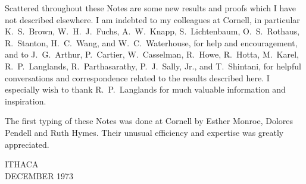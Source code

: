 Scattered throughout these Notes are some new results and proofs which I have not described elsewhere. I am indebted to my colleagues at Cornell, in particular K.~S.~Brown, W.~H.~J.~Fuchs, A.~W.~Knapp, S.~Lichtenbaum, O.~S.~Rothaus, R.~Stanton, H.~C.~Wang, and W.~C.~Waterhouse, for help and encouragement, and to J.~G.~Arthur, P.~Cartier, W.~Casselman, R.~Howe, R.~Hotta, M.~Karel, R.~P.~Langlands, R.~Parthasarathy, P.~J.~Sally, Jr., and T.~Shintani, for helpful conversations and correspondence related to the results described here. I especially wish to thank R.~P.~Langlands for much valuable information and inspiration.

The first typing of these Notes was done at Cornell by Esther Monroe, Dolores Pendell and Ruth Hymes. Their unusual efficiency and expertise was greatly appreciated.

\begin{flushright}
ITHACA\\[0.3em]
DECEMBER 1973
\end{flushright}
